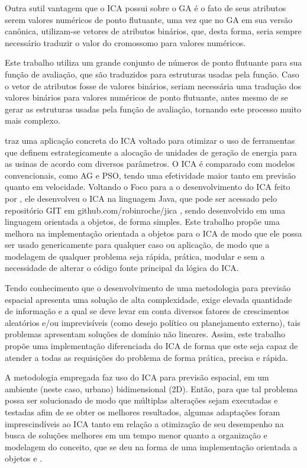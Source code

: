 Outra sutil vantagem que o ICA possui sobre o GA é o fato de seus atributos serem valores numéricos de ponto flutuante, uma vez que no GA em sua versão canônica, utilizam-se vetores de atributos binários, que, desta forma, seria sempre necessário traduzir o valor do cromossomo para valores numéricos. 

Este trabalho utiliza um grande conjunto de números de ponto flutuante para sua função de avaliação, que são traduzidos para estruturas usadas pela função. Caso o vetor de atributos fosse de valores binários, seriam necessária uma tradução dos valores binários para valores numéricos de ponto flutuante, antes mesmo de se gerar as estruturas usadas pela função de avaliação, tornando este processo muito mais complexo.

\cite{roche2011imperialist} traz uma aplicação concreta do ICA voltado para otimizar o uso de ferramentas que definem estrategicamente a alocação de unidades de geração de energia para as usinas de acordo com diversos parâmetros. O ICA é comparado com modelos convencionais, como AG e PSO, tendo uma efetividade maior tanto em previsão quanto em velocidade. Voltando o Foco para a o desenvolvimento do ICA feito por \citeauthor{roche2011imperialist}, ele desenvolveu o ICA na linguagem Java, que pode ser acessado pelo repositório GIT em github.com/robinroche/jica \cite{jica}, sendo desenvolvido em uma linguagem orientada a objetos, de forma simples. Este trabalho propõe uma melhora na implementação orientada a objetos para o ICA de modo que ele possa ser usado genericamente para qualquer caso ou aplicação, de modo que a modelagem de qualquer problema seja rápida, prática, modular e sem a necessidade de alterar o código fonte principal da lógica do ICA. 

Tendo conhecimento que o desenvolvimento de uma metodologia para previsão espacial apresenta uma solução de alta complexidade, exige elevada quantidade de informação e a qual se deve levar em conta diversos fatores de crescimentos aleatórios e/ou imprevisíveis (como desejo político ou planejamento externo), tais problemas apresentam soluções de domínio não lineares. Assim, este trabalho propõe uma implementação diferenciada do ICA de forma que este seja capaz de atender a todas as requisições do problema de forma prática, precisa e rápida. 

A metodologia empregada faz uso do ICA para previsão espacial, em um ambiente (neste caso, urbano) bidimensional (2D). Então, para que tal problema possa ser solucionado de modo que múltiplas alterações sejam executadas e testadas afim de se obter os melhores resultados, algumas adaptações foram imprescindíveis ao ICA tanto em relação a otimização de seu desempenho na busca de soluções melhores em um tempo menor  quanto a organização e modelagem do conceito, que se deu na forma de uma implementação orientada a objetos \cite{booch1982object} e \cite{coad1991object}. 

